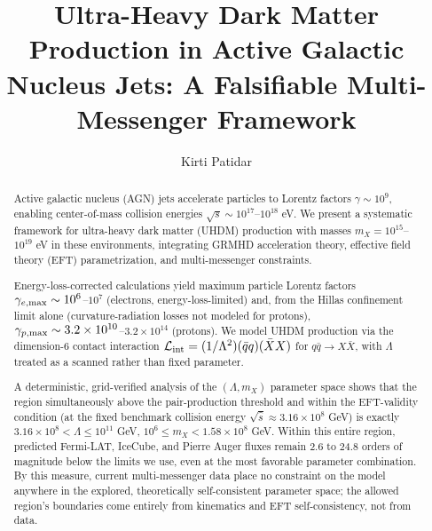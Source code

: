 \documentclass[twocolumn,superscriptaddress,prd,nofootinbib]{revtex4-2}
\begin{document}
\title{Ultra-Heavy Dark Matter Production in Active Galactic Nucleus Jets: A Falsifiable Multi-Messenger Framework}

\author{Kirti Patidar}


\begin{abstract}
Active galactic nucleus (AGN) jets accelerate particles to Lorentz factors $\gamma \sim 10^9$, enabling center-of-mass collision energies $\sqrt{s} \sim 10^{17}$--$10^{18}$ eV. We present a systematic framework for ultra-heavy dark matter (UHDM) production with masses $m_X = 10^{15}$--$10^{19}$ eV in these environments, integrating GRMHD acceleration theory, effective field theory (EFT) parametrization, and multi-messenger constraints.

Energy-loss-corrected calculations yield maximum particle Lorentz factors $\gamma_{e,\rm max} \sim 10^6$--$10^7$ (electrons, energy-loss-limited) and, from the Hillas confinement limit alone (curvature-radiation losses not modeled for protons), $\gamma_{p,\rm max} \sim 3.2\times10^{10}$--$3.2\times10^{14}$ (protons). We model UHDM production via the dimension-6 contact interaction $\mathcal{L}_{\rm int} = (1/\Lambda^2)(\bar{q}q)(\bar{X}X)$ for $q\bar{q}\to X\bar{X}$, with $\Lambda$ treated as a scanned rather than fixed parameter.

A deterministic, grid-verified analysis of the $(\Lambda, m_X)$ parameter space shows that the region simultaneously above the pair-production threshold and within the EFT-validity condition (at the fixed benchmark collision energy $\sqrt{\hat{s}}\approx3.16\times10^8$ GeV) is exactly $3.16\times10^8 < \Lambda \le 10^{11}$ GeV, $10^6 \le m_X < 1.58\times10^8$ GeV. Within this entire region, predicted Fermi-LAT, IceCube, and Pierre Auger fluxes remain 2.6 to 24.8 orders of magnitude below the limits we use, even at the most favorable parameter combination. By this measure, current multi-messenger data place no constraint on the model anywhere in the explored, theoretically self-consistent parameter space; the allowed region's boundaries come entirely from kinematics and EFT self-consistency, not from data.
\end{abstract}


\maketitle
\end{document}
